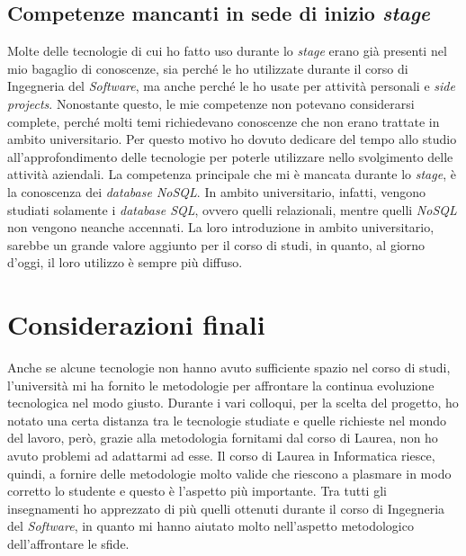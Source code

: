 \subsection{Competenze mancanti in sede di inizio \emph{stage}}
Molte delle tecnologie di cui ho fatto uso durante lo \emph{stage} erano già presenti nel mio bagaglio di conoscenze, sia perché le ho utilizzate durante il corso di Ingegneria del \emph{Software}, ma anche perché le ho usate per attività personali e \emph{side projects}.
Nonostante questo, le mie competenze non potevano considerarsi complete, perché molti temi richiedevano conoscenze che non erano trattate in ambito universitario.
Per questo motivo ho dovuto dedicare del tempo allo studio all'approfondimento delle tecnologie per poterle utilizzare nello svolgimento delle attività aziendali.
La competenza principale che mi è mancata durante lo \emph{stage}, è la conoscenza dei \emph{database NoSQL}.
In ambito universitario, infatti, vengono studiati solamente i \emph{database SQL}, ovvero quelli relazionali, mentre quelli \emph{NoSQL} non vengono neanche accennati.
La loro introduzione in ambito universitario, sarebbe un grande valore aggiunto per il corso di studi, in quanto, al giorno d'oggi, il loro utilizzo è sempre più diffuso.

\section{Considerazioni finali}
Anche se alcune tecnologie non hanno avuto sufficiente spazio nel corso di studi, l'università mi ha fornito le metodologie per affrontare la continua evoluzione tecnologica nel modo giusto.
Durante i vari colloqui, per la scelta del progetto, ho notato una certa distanza tra le tecnologie studiate e quelle richieste nel mondo del lavoro, però, grazie alla metodologia fornitami dal corso di Laurea, non ho avuto problemi ad adattarmi ad esse.
Il corso di Laurea in Informatica riesce, quindi, a fornire delle metodologie molto valide che riescono a plasmare in modo corretto lo studente e questo è l'aspetto più importante. 
Tra tutti gli insegnamenti ho apprezzato di più quelli ottenuti durante il corso di Ingegneria del \emph{Software}, in quanto mi hanno aiutato molto nell'aspetto metodologico dell'affrontare le sfide.